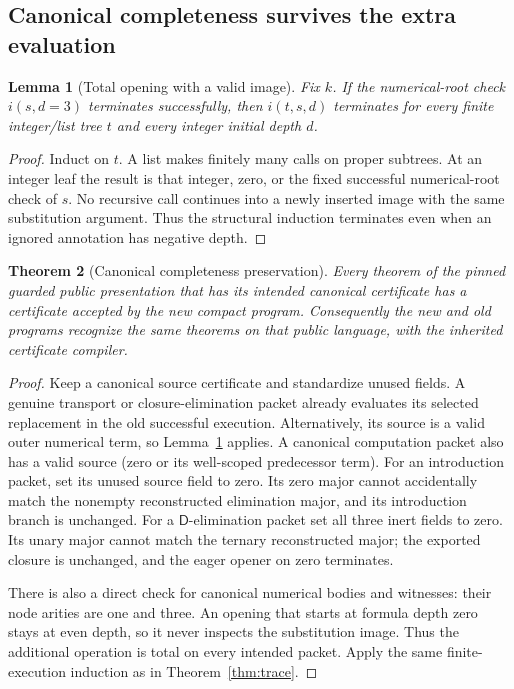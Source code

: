 \documentclass[11pt,letterpaper]{article}
\newtheorem{theorem}{Theorem}[section]
\newtheorem{lemma}[theorem]{Lemma}
\theoremstyle{definition}
\newcommand{\D}{\mathsf D}
\begin{document}
\subsection{Canonical completeness survives the extra evaluation}
\begin{lemma}[Total opening with a valid image]\label{lem:total}
Fix $k$. If the numerical-root check $i(s,d=3)$ terminates successfully,
then $i(t,s,d)$ terminates for every finite integer/list tree $t$ and every
integer initial depth $d$.
\end{lemma}
\begin{proof}
Induct on $t$. A list makes finitely many calls on proper subtrees. At an
integer leaf the result is that integer, zero, or the fixed successful
numerical-root check of $s$. No recursive call continues into a newly
inserted image with the same substitution argument. Thus the structural
induction terminates even when an ignored annotation has negative depth.
\end{proof}

\begin{theorem}[Canonical completeness preservation]\label{thm:complete}
Every theorem of the pinned guarded public presentation that has its
intended canonical certificate has a certificate accepted by the new
compact program. Consequently the new and old programs recognize the same
theorems on that public language, with the inherited certificate compiler.
\end{theorem}
\begin{proof}
Keep a canonical source certificate and standardize unused fields. A
genuine transport or closure-elimination packet already evaluates its
selected replacement in the old successful execution. Alternatively, its
source is a valid outer numerical term, so Lemma~\ref{lem:total} applies.
A canonical computation packet also has a valid source (zero or its
well-scoped predecessor term). For an introduction packet, set its unused
source field to zero. Its zero major cannot accidentally match the
nonempty reconstructed elimination major, and its introduction branch is
unchanged. For a $\D$-elimination packet set all three inert fields to zero.
Its unary major cannot match the ternary reconstructed major; the exported
closure is unchanged, and the eager opener on zero terminates.

There is also a direct check for canonical numerical bodies and witnesses:
their node arities are one and three. An opening that starts at formula
depth zero stays at even depth, so it never inspects the substitution image.
Thus the additional operation is total on every intended packet. Apply
the same finite-execution induction as in Theorem~\ref{thm:trace}.
\end{proof}
\end{document}
